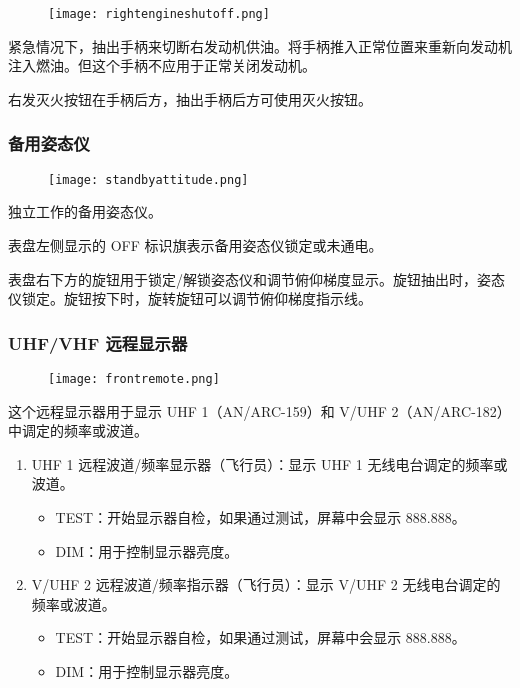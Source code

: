\begin{figure}[htb]
  \center
  \texttt{[image: rightengineshutoff.png]}
\end{figure}
紧急情况下，抽出手柄来切断右发动机供油。将手柄推入正常位置来重新向发动机注入燃油。但这个手柄不应用于正常关闭发动机。

右发灭火按钮在手柄后方，抽出手柄后方可使用灭火按钮。

\subsubsection{备用姿态仪}

\begin{figure}[htb]
  \center
  \texttt{[image: standbyattitude.png]}
\end{figure}
独立工作的备用姿态仪。

表盘左侧显示的 OFF 标识旗表示备用姿态仪锁定或未通电。

表盘右下方的旋钮用于锁定/解锁姿态仪和调节俯仰梯度显示。旋钮抽出时，姿态仪锁定。旋钮按下时，旋转旋钮可以调节俯仰梯度指示线。

\subsubsection{UHF/VHF 远程显示器}

\begin{figure}[htb]
  \center
  \texttt{[image: frontremote.png]}
\end{figure}
这个远程显示器用于显示 UHF 1（AN/ARC-159）和 V/UHF 2（AN/ARC-182）中调定的频率或波道。

\begin{enumerate}
  \item UHF 1 远程波道/频率显示器（飞行员）：显示 UHF 1 无线电台调定的频率或波道。
  \begin{itemize}
    \item TEST：开始显示器自检，如果通过测试，屏幕中会显示 888.888。
    \item DIM：用于控制显示器亮度。
  \end{itemize}
  \item V/UHF 2 远程波道/频率指示器（飞行员）：显示 V/UHF 2 无线电台调定的频率或波道。
  \begin{itemize}
    \item TEST：开始显示器自检，如果通过测试，屏幕中会显示 888.888。
    \item DIM：用于控制显示器亮度。
  \end{itemize}
\end{enumerate}

